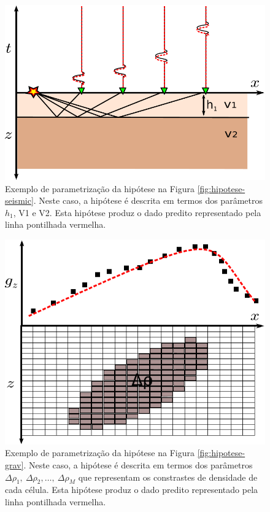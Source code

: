 \begin{figure}
    \centering
    \includegraphics[scale=1]{figs/params-seismic}
    \caption{Exemplo de parametrização da hipótese na Figura
    \ref{fig:hipotese-seismic}. Neste caso, a hipótese é descrita em termos
    dos parâmetros $h_1$, V1 e V2. Esta hipótese produz o dado predito
    representado pela linha pontilhada vermelha.}
    \label{fig:params-seismic}
\end{figure}

\begin{figure}
    \centering
    \includegraphics[scale=1]{figs/params-grav}
    \caption{Exemplo de parametrização da hipótese na Figura
    \ref{fig:hipotese-grav}. Neste caso, a hipótese é descrita em termos
    dos parâmetros $\Delta\rho_1,\ \Delta\rho_2, \dotsc,\ \Delta\rho_M$ que
    representam os constrastes de densidade de cada célula.
    Esta hipótese produz o dado predito
    representado pela linha pontilhada vermelha.}
    \label{fig:params-grav}
\end{figure}

